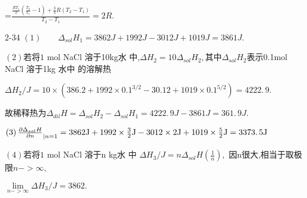 \documentclass{ctexart}
\begin{document}
=$\frac{\frac{RT_{1}}{2}\left( \frac{T_{2}}{T_{1}}-1\right) +\frac{3}{2}%
R\left( T_{2}-T_{1}\right) }{T_{2}-T_{1}}=\allowbreak 2R.$

2-34 $\left( 1\right) \qquad \Delta _{sol}H_{1}=3862\unit{J}+1992\unit{J}%
-3012\unit{J}+1019\unit{J}=\allowbreak 3861\unit{J}.$

$\left( 2\right) $若将$1$ mol NaCl 溶于10kg水%
中,$\Delta H_{2}=10\Delta _{sol}H_{2},$其中$\Delta
_{sol}H_{2}$表示0.1mol NaCl 溶于1kg 水中%
的溶解热

$\Delta H_{2}/\unit{J}=10\times \left( 386.2+1992\times
0.1^{3/2}-30.12+1019\times 0.1^{5/2}\right) =\allowbreak 4222.\,\allowbreak
9.$

故稀释热为\qquad $\Delta _{dil}H=\Delta
_{sol}H_{2}-\Delta _{sol}H_{1}=\allowbreak \allowbreak 4222.\,\allowbreak 9%
\unit{J}-\allowbreak 3861\unit{J}=\allowbreak 361.\,\allowbreak 9\unit{J}.$

$\left( 3\right) \frac{\partial \Delta _{sol}H}{\partial n}_{|n=1}=3862\unit{%
J}+1992\times \frac{3}{2}\unit{J}-3012\times 2\unit{J}+1019\times \frac{5}{2}%
\unit{J}=\allowbreak 3373.\,\allowbreak 5\unit{J}$

$\left( 4\right) $若将$1$ mol NaCl 溶于n kg水%
中 $\Delta H_{3}/\unit{J}=n\Delta _{sol}H\left( \frac{1}{n}\right) ,$%
因n很大,相当于取极限$%
n->\infty ,$

$\underset{n->\infty }{\lim }\Delta H_{3}/\unit{J}=3862.$
\end{document}
